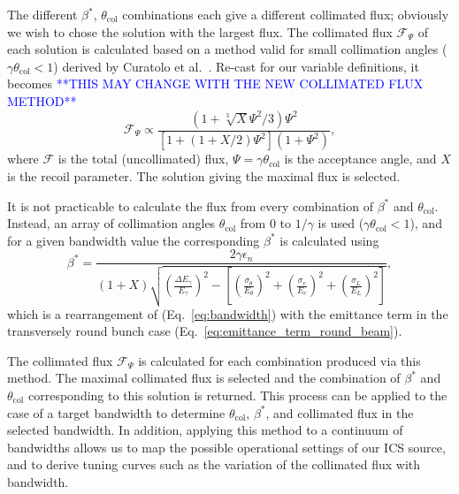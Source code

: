 \documentclass[../main.tex]{subfiles}
\begin{document}
The different $\beta^{*}$, $\theta_{\mathrm{col}}$ combinations each give a different collimated flux; obviously we wish to chose the solution with the largest flux. The collimated flux $\mathcal{F}_{\Psi}$ of each solution is calculated based on a method valid for small collimation angles ($\gamma\theta_{\mathrm{col}} < 1$) derived by Curatolo et al.~\cite{curatolo2017analytical}. Re-cast for our variable definitions, it becomes
\textcolor{blue}{**THIS MAY CHANGE WITH THE NEW COLLIMATED FLUX METHOD**}
\begin{equation}
\mathcal{F}_{\Psi}\propto \frac{\left(1+\sqrt[3]{X}\Psi^{2}/3\right)\Psi^{2}}{\left[1+\left(1+X/2\right)\Psi^{2}\right]\left(1+\Psi^{2}\right)}, 
\label{eq:curatolo_collimated_flux}
\end{equation}
where $\mathcal{F}$ is the total (uncollimated) flux, $\Psi = \gamma\theta_{\mathrm{col}}$ is the acceptance angle, and $X$ is the recoil parameter. The solution giving the maximal flux is selected.

It is not practicable to calculate the flux from every combination of $\beta^{*}$ and $\theta_{\mathrm{col}}$. Instead, an array of collimation angles $\theta_{\mathrm{col}}$ from 0 to $1/\gamma$ is used ($\gamma\theta_{\mathrm{col}}<1$), and for a given bandwidth value the corresponding $\beta^*$ is calculated using
\begin{equation}
\beta^{*} = \frac{2\gamma\epsilon_{n}}{\left(1+X\right)\sqrt{\left(\frac{\Delta E_{\gamma}}{E_{\gamma}}\right)^{2}-\left[\left(\frac{\sigma_{\theta}}{E_{\theta}}\right)^{2}+\left(\frac{\sigma_{e}}{E_{e}}\right)^{2}+\left(\frac{\sigma_{L}}{E_{L}}\right)^{2}\right]}},
\label{eq:beta_star_round_beam}
\end{equation}
which is a rearrangement of (Eq.~\ref{eq:bandwidth}) with the emittance term in the transversely round bunch case (Eq.~\ref{eq:emittance_term_round_beam}). 

The collimated flux $\mathcal{F}_{\Psi}$ is calculated for each combination produced via this method. The maximal collimated flux is selected and the combination of $\beta^{*}$ and $\theta_{\mathrm{col}}$ corresponding to this solution is returned. This process can be applied to the case of a target bandwidth to determine $\theta_{\mathrm{col}}$, $\beta^{*}$, and collimated flux in the selected bandwidth. In addition, applying this method to a continuum of bandwidths allows us to map the possible operational settings of our ICS source, and to derive tuning curves such as the variation of the collimated flux with bandwidth.
\end{document}
